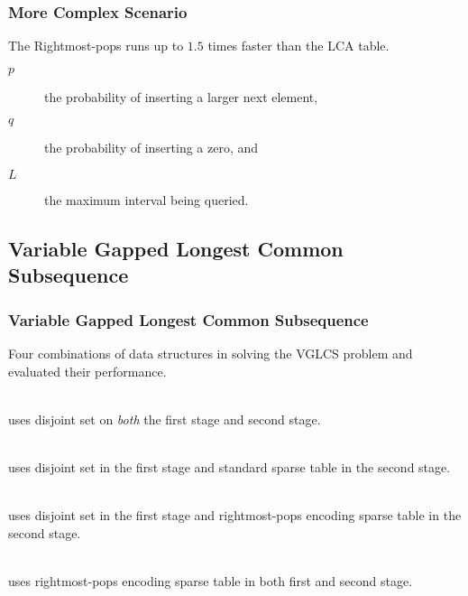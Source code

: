 \begin{withoutheadline}
\begin{frame}
	\frametitle{More Complex Scenario}
	The Rightmost-pops runs up to $1.5$ times faster than the LCA table.
	\begin{description}
		\item[$p$]
			the probability of inserting a larger next element,
		\item[$q$]
			the probability of inserting a zero, and
		\item[$L$]
			the maximum interval being queried.
	\end{description}
	\begin{center}
	\scalebox{0.65} { \begin{minipage}{1.53\textwidth}
			
			\end{minipage}
		}
	\end{center}
\end{frame}
\end{withoutheadline}

\subsection{Variable Gapped Longest Common Subsequence}

\begin{withoutheadline}
\begin{frame}
    \frametitle{Variable Gapped Longest Common Subsequence}
	Four combinations of data structures in solving the VGLCS problem
	and evaluated their performance.

	\begin{description}
		\setlength\itemsep{0.5em}
		\item[Peng's algorithm] \hfill \\
			uses disjoint set on {\em both} the first stage and second stage.
		\item[{\sc DS-ST}] \hfill \\
			uses disjoint set in the first stage and standard sparse table in the
			second stage.
		\item[{\sc DS-BST}] \hfill \\
			uses disjoint set in the first stage and rightmost-pops
			encoding sparse table in the second stage.
		\item[{\sc BST2}] \hfill \\
			uses rightmost-pops encoding sparse table in both first and
			second stage.
	\end{description}
\end{frame}
\end{withoutheadline}

